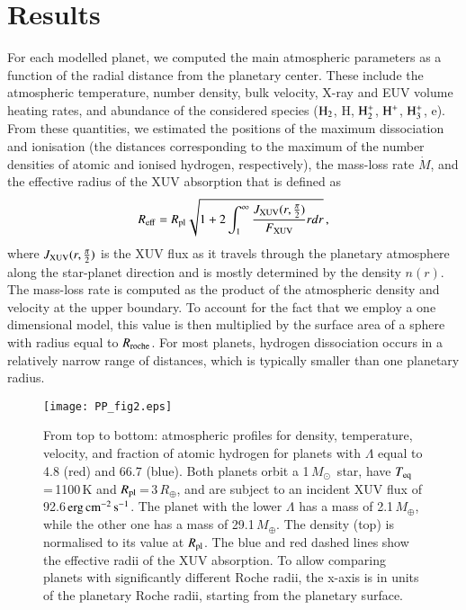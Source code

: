 \documentclass{aa}
\def\hhh{{\rm H_3^+}}
\def\hh{{\rm H_2}}
\def\hp{{\rm H^+}}
\def\hhp{{\rm H_2^+}}
\def\ergscm{$\rm erg\,cm^{-2}\,s^{-1}$}
\def\Teq{$T_{\rm eq}$}
\def\Rpl{$R_{\rm pl}$}
\def\Re{\ensuremath{R_{\oplus}}}
\def\Me{\ensuremath{M_{\oplus}}}
\def\Mo{\ensuremath{M_{\odot}}}
\begin{document}
\section{Results}\label{sec:results}
%
For each modelled planet, we computed the main atmospheric parameters as a function of the radial distance from the planetary center. These include the atmospheric temperature, number density, bulk velocity, X-ray and EUV volume heating rates, and abundance of the considered species ($\hh$, H, $\hhp$, $\hp$, $\hhh$, e). From these quantities, we estimated the positions of the maximum dissociation and ionisation (the distances corresponding to the maximum of the number densities of atomic and ionised hydrogen, respectively), the mass-loss rate $\dot{M}$, and the effective radius of the XUV absorption that is defined as
%
\begin{equation}\label{eqn:reff}
R_{\rm eff} = R_{\rm pl}\sqrt{1 + 2\int_1^{\infty}\frac{J_{\rm XUV}(r,\frac{\pi}{2})}{F_{\rm XUV}}rdr}\,,
\end{equation}
%
where $J_{\rm XUV}(r,\frac{\pi}{2})$ is the XUV flux as it travels through the planetary atmosphere along the star-planet direction and is mostly determined by the density $n(r)$. The mass-loss rate is computed as the product of the atmospheric density and velocity at the upper boundary. To account for the fact that we employ a one dimensional model, this value is then multiplied by the surface area of a sphere with radius equal to $R_{\rm roche}$. For most planets, hydrogen dissociation occurs in a relatively narrow range of distances, which is typically smaller than one planetary radius.
\begin{figure}
\texttt{[image: PP\_fig2.eps]}
\caption{From top to bottom: atmospheric profiles for density, temperature, velocity, and fraction of atomic hydrogen for planets with $\Lambda$ equal to 4.8 (red) and 66.7 (blue). Both planets orbit a 1\,\Mo\ star, have \Teq\,=\,1100\,K and \Rpl\,=\,3\,\Re, and are subject to an incident XUV flux of
92.6\,\ergscm. The planet with the lower $\Lambda$ has a mass of 2.1\,\Me, while the other one has a mass of 29.1\,\Me. The density (top) is normalised to its value at \Rpl. The blue and red dashed lines show the effective radii of the XUV absorption. To allow comparing planets with significantly different Roche radii, the x-axis is in units of the planetary Roche radii, starting from the planetary surface.}
\label{fig:profiles}
\end{figure}
\end{document}
